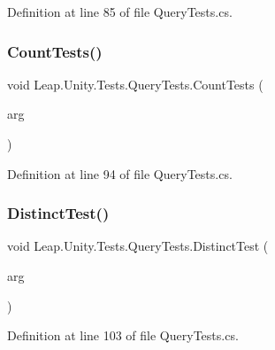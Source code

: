 Definition at line 85 of file Query\+Tests.\+cs.

\mbox{\label{class_leap_1_1_unity_1_1_tests_1_1_query_tests_ae07891711ed2aba14f29f0769dee281f}} 
\subsubsection{\texorpdfstring{CountTests()}{CountTests()}}
{\footnotesize\ttfamily void Leap.\+Unity.\+Tests.\+Query\+Tests.\+Count\+Tests (\begin{DoxyParamCaption}\item[{\mbox{[}\+Value\+Source(\char`\"{}list0\char`\"{})\mbox{]} \mbox{\hyperlink{class_leap_1_1_unity_1_1_tests_1_1_query_tests_1_1_query_arg}{Query\+Arg}}}]{arg }\end{DoxyParamCaption})}



Definition at line 94 of file Query\+Tests.\+cs.

\mbox{\label{class_leap_1_1_unity_1_1_tests_1_1_query_tests_a7f6724647f757d5d2d62f3e4b2d3ccc8}} 
\subsubsection{\texorpdfstring{DistinctTest()}{DistinctTest()}}
{\footnotesize\ttfamily void Leap.\+Unity.\+Tests.\+Query\+Tests.\+Distinct\+Test (\begin{DoxyParamCaption}\item[{\mbox{[}\+Value\+Source(\char`\"{}list0\char`\"{})\mbox{]} \mbox{\hyperlink{class_leap_1_1_unity_1_1_tests_1_1_query_tests_1_1_query_arg}{Query\+Arg}}}]{arg }\end{DoxyParamCaption})}



Definition at line 103 of file Query\+Tests.\+cs.

\mbox{\label{class_leap_1_1_unity_1_1_tests_1_1_query_tests_ad54707c01c325e5af9184a40da2f19d0}} 
